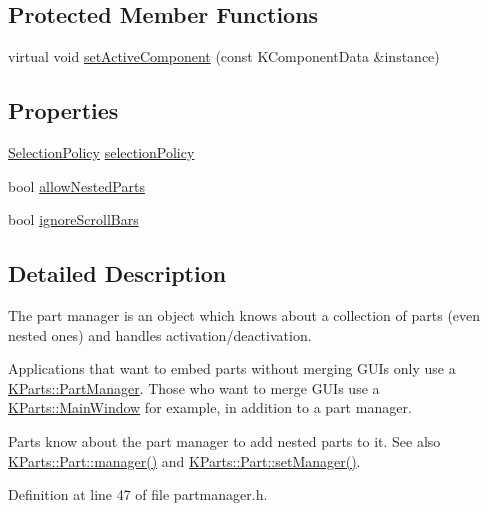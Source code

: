 \subsection*{\-Protected \-Member \-Functions}
\begin{DoxyCompactItemize}
\item 
virtual void \hyperlink{classKParts_1_1PartManager_a17cac95827d9bccd23b766582ad349ab}{set\-Active\-Component} (const \-K\-Component\-Data \&instance)
\end{DoxyCompactItemize}
\subsection*{\-Properties}
\begin{DoxyCompactItemize}
\item 
\hyperlink{classKParts_1_1PartManager_a7db25fb7e7f91548fa15566b3af4bb34}{\-Selection\-Policy} \hyperlink{classKParts_1_1PartManager_a277840d67f7fbbacf3e11a272d649ac1}{selection\-Policy}
\item 
bool \hyperlink{classKParts_1_1PartManager_a779543221cd7fa24276da76cf17226f4}{allow\-Nested\-Parts}
\item 
bool \hyperlink{classKParts_1_1PartManager_a070b8ead9df929e2de58fc4a02b9e8ba}{ignore\-Scroll\-Bars}
\end{DoxyCompactItemize}


\subsection{\-Detailed \-Description}
\-The part manager is an object which knows about a collection of parts (even nested ones) and handles activation/deactivation.

\-Applications that want to embed parts without merging \-G\-U\-Is only use a \hyperlink{classKParts_1_1PartManager}{\-K\-Parts\-::\-Part\-Manager}. \-Those who want to merge \-G\-U\-Is use a \hyperlink{classKParts_1_1MainWindow}{\-K\-Parts\-::\-Main\-Window} for example, in addition to a part manager.

\-Parts know about the part manager to add nested parts to it. \-See also \hyperlink{classKParts_1_1Part_a06ea4dd249752f23229bc30b693eed44}{\-K\-Parts\-::\-Part\-::manager()} and \hyperlink{classKParts_1_1Part_afb87e3aed12cfdd6ecf057f916c7889f}{\-K\-Parts\-::\-Part\-::set\-Manager()}. 

\-Definition at line 47 of file partmanager.\-h.



